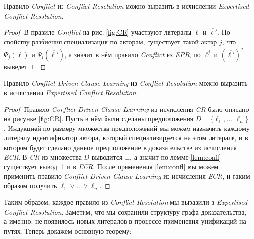 \begin{lemma}
\label{lem:confl}
Правило \emph{Conflict} из \emph{Conflict Resolution} можно выразить в исчислении \emph{Expertised Conflict Resolution}.
\end{lemma}
\begin{proof}
В правиле \emph{Conflict} на рис. \ref{fig:CR} участвуют литералы $\ell$ и $\overline{\ell'}$. По свойству разбиения специализации по акторам, существует такой актор $j$, что $\Psi_j(\ell)$ и $\Psi_j(\overline{\ell'})$, а значит в нём правило \emph{Conflict} из \emph{EPR}, по $\ell^j\text{ и }(\overline{\ell'})^j$ выведет $\bot$.
\end{proof}

\begin{lemma}
\label{lem:cdcl}
Правило \emph{Conflict-Driven Clause Learning} из \emph{Conflict Resolution} можно выразить в исчислении \emph{Expertised Conflict Resolution}.
\end{lemma}
\begin{proof}
Правило \emph{Conflict-Driven Clause Learning} из исчисления \emph{CR} было описано на рисунке \ref{fig:CR}. Пусть в нём были сделаны предположения $D = \{\ell_1, \ldots, \ell_n\}$. Индукцией по размеру множества предположений мы можем назначить каждому литералу идентификатор актора, который специализируется на этом литерале, и в котором будет сделано данное предположение в доказательстве из исчисления \emph{ECR}. В \emph{CR} из множества $D$ выводится $\bot$, а значит по лемме \ref{lem:confl} существует вывод $\bot$ и в \emph{ECR}. После применения \ref{lem:confl} мы можем применить правило \emph{Conflict-Driven Clause Learning} из исчисления \emph{ECR}, и таким образом получить $\ell_1 \vee \ldots \vee \ell_n$.
\end{proof}

Таким образом, каждое правило из \emph{Conflict Resolution} мы выразили в \emph{Expertised Conflict Resolution}. Заметим, что мы сохранили структуру графа доказательства, а именно: не появилось новых литералов в процессе применения унификаций на путях. Теперь докажем основную теорему:

